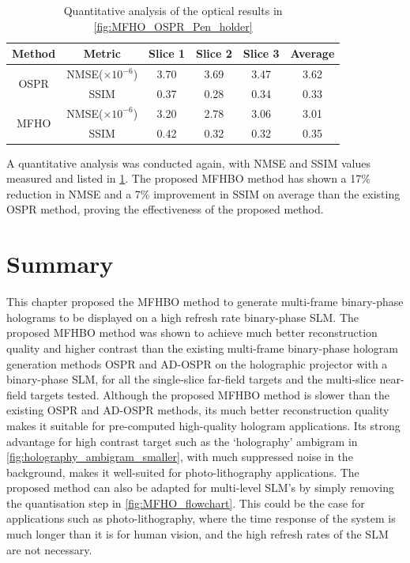 	\begin{table}[H]
	\centering
	\begin{tabular}{|c|c|c|c|c|c|}
	\hline
	\textbf{Method} & \textbf{Metric} & \textbf{Slice 1} & \textbf{Slice 2} & \textbf{Slice 3} & \textbf{Average} \\ \hline
	\multirow{2}{*}{OSPR} & NMSE($\times 10^{-6}$) & 3.70 & 3.69 & 3.47 & 3.62 \\ \cline{2-6}
						  & SSIM                   & 0.37 & 0.28 & 0.34 & 0.33 \\ \hline
	\multirow{2}{*}{MFHO} & NMSE($\times 10^{-6}$) & 3.20 & 2.78 & 3.06 & 3.01 \\ \cline{2-6}
						  & SSIM                   & 0.42 & 0.32 & 0.32 & 0.35 \\ \hline
	\end{tabular}
	\caption{Quantitative analysis of the optical results in \cref{fig:MFHO_OSPR_Pen_holder}}
	\label{tab:quant_MFHO_Pen_holder}
	\end{table}

	A quantitative analysis was conducted again, with NMSE and SSIM values measured and listed in \cref{tab:quant_MFHO_Pen_holder}. The proposed MFHBO method has shown a 17\% reduction in NMSE and a 7\% improvement in SSIM on average than the existing OSPR method, proving the effectiveness of the proposed method.


\section{Summary}
	This chapter proposed the MFHBO method to generate multi-frame binary-phase holograms to be displayed on a high refresh rate binary-phase SLM. The proposed MFHBO method was shown to achieve much better reconstruction quality and higher contrast than the existing multi-frame binary-phase hologram generation methods OSPR \cite{Cable2004} and AD-OSPR \cite{Kaczorowski2016} on the holographic projector with a binary-phase SLM, for all the single-slice far-field targets and the multi-slice near-field targets tested. Although the proposed MFHBO method is slower than the existing OSPR and AD-OSPR methods, its much better reconstruction quality makes it suitable for pre-computed high-quality hologram applications. Its strong advantage for high contrast target such as the `holography' ambigram in \cref{fig:holography_ambigram_smaller}, with much suppressed noise in the background, makes it well-suited for photo-lithography applications. The proposed method can also be adapted for multi-level SLM's by simply removing the quantisation step in \cref{fig:MFHO_flowchart}. This could be the case for applications such as photo-lithography, where the time response of the system is much longer than it is for human vision, and the high refresh rates of the SLM are not necessary.


